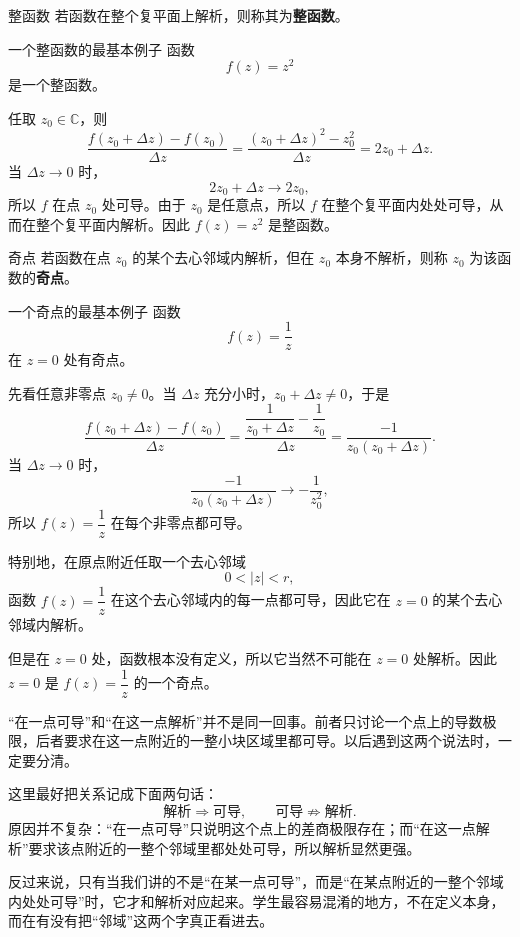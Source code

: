 \begin{dingliyi}{整函数}{}
若函数在整个复平面上解析，则称其为\textbf{整函数}。
\end{dingliyi}

\begin{lizi}{一个整函数的最基本例子}{}
函数
\[
    f(z)=z^2
\]
是一个整函数。

\begin{jie}
任取 $z_0\in\mathbb{C}$，则
\[
    \frac{f(z_0+\Delta z)-f(z_0)}{\Delta z}
    =\frac{(z_0+\Delta z)^2-z_0^2}{\Delta z}
    =2z_0+\Delta z.
\]
当 $\Delta z\to 0$ 时，
\[
    2z_0+\Delta z\to 2z_0,
\]
所以 $f$ 在点 $z_0$ 处可导。由于 $z_0$ 是任意点，所以 $f$ 在整个复平面内处处可导，从而在整个复平面内解析。因此 $f(z)=z^2$ 是整函数。
\end{jie}
\end{lizi}

\begin{dingliyi}{奇点}{}
若函数在点 $z_0$ 的某个去心邻域内解析，但在 $z_0$ 本身不解析，则称 $z_0$ 为该函数的\textbf{奇点}。
\end{dingliyi}

\begin{lizi}{一个奇点的最基本例子}{}
函数
\[
    f(z)=\frac{1}{z}
\]
在 $z=0$ 处有奇点。

\begin{jie}
先看任意非零点 $z_0\neq 0$。当 $\Delta z$ 充分小时，$z_0+\Delta z\neq 0$，于是
\[
    \frac{f(z_0+\Delta z)-f(z_0)}{\Delta z}
    =
    \frac{\dfrac{1}{z_0+\Delta z}-\dfrac{1}{z_0}}{\Delta z}
    =
    \frac{-1}{z_0(z_0+\Delta z)}.
\]
当 $\Delta z\to 0$ 时，
\[
    \frac{-1}{z_0(z_0+\Delta z)}\to -\frac{1}{z_0^2},
\]
所以 $f(z)=\dfrac{1}{z}$ 在每个非零点都可导。

特别地，在原点附近任取一个去心邻域
\[
    0<|z|<r,
\]
函数 $f(z)=\dfrac{1}{z}$ 在这个去心邻域内的每一点都可导，因此它在 $z=0$ 的某个去心邻域内解析。

但是在 $z=0$ 处，函数根本没有定义，所以它当然不可能在 $z=0$ 处解析。因此 $z=0$ 是 $f(z)=\dfrac{1}{z}$ 的一个奇点。
\end{jie}
\end{lizi}

\begin{zhu}{}{}
``在一点可导''和``在这一点解析''并不是同一回事。前者只讨论一个点上的导数极限，后者要求在这一点附近的一整小块区域里都可导。以后遇到这两个说法时，一定要分清。
\end{zhu}

\begin{tishi}[可导和解析到底是什么关系]
这里最好把关系记成下面两句话：
\[
    \text{解析}\Longrightarrow \text{可导},\qquad
    \text{可导}\not\Longrightarrow \text{解析}.
\]
原因并不复杂：``在一点可导''只说明这个点上的差商极限存在；而``在这一点解析''要求该点附近的一整个邻域里都处处可导，所以解析显然更强。

反过来说，只有当我们讲的不是``在某一点可导''，而是``在某点附近的一整个邻域内处处可导''时，它才和解析对应起来。学生最容易混淆的地方，不在定义本身，而在有没有把``邻域''这两个字真正看进去。
\end{tishi}

